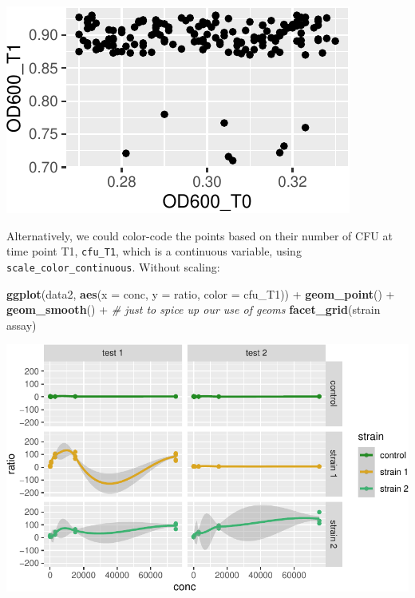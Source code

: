 \documentclass[]{book}
\newenvironment{Shaded}{}{}
\newcommand{\CommentTok}[1]{\textcolor[rgb]{0.38,0.63,0.69}{\textit{#1}}}
\newcommand{\DataTypeTok}[1]{\textcolor[rgb]{0.56,0.13,0.00}{#1}}
\newcommand{\KeywordTok}[1]{\textcolor[rgb]{0.00,0.44,0.13}{\textbf{#1}}}
\newcommand{\NormalTok}[1]{#1}
\newcommand{\OperatorTok}[1]{\textcolor[rgb]{0.40,0.40,0.40}{#1}}
\newcommand{\StringTok}[1]{\textcolor[rgb]{0.25,0.44,0.63}{#1}}
\begin{document}
\begin{center}\includegraphics[width=\textwidth]{TRES-Tidy-Tutorial_files/figure-latex/unnamed-chunk-138-1} \end{center}

Alternatively, we could color-code the points based on their number of CFU at time point T1, \texttt{cfu\_T1}, which is a continuous variable, using \texttt{scale\_color\_continuous}. Without scaling:

\begin{Shaded}
\begin{Highlighting}[]
\KeywordTok{ggplot}\NormalTok{(data2, }\KeywordTok{aes}\NormalTok{(}\DataTypeTok{x =}\NormalTok{ conc, }\DataTypeTok{y =}\NormalTok{ ratio, }\DataTypeTok{color =}\NormalTok{ cfu_T1)) }\OperatorTok{+}
\StringTok{  }\KeywordTok{geom_point}\NormalTok{() }\OperatorTok{+}
\StringTok{  }\KeywordTok{geom_smooth}\NormalTok{() }\OperatorTok{+}\StringTok{ }\CommentTok{# just to spice up our use of geoms}
\StringTok{  }\KeywordTok{facet_grid}\NormalTok{(strain }\OperatorTok{~}\StringTok{ }\NormalTok{assay)}
\end{Highlighting}
\end{Shaded}

\begin{center}\includegraphics[width=\textwidth]{TRES-Tidy-Tutorial_files/figure-latex/unnamed-chunk-139-1} \end{center}
\end{document}
